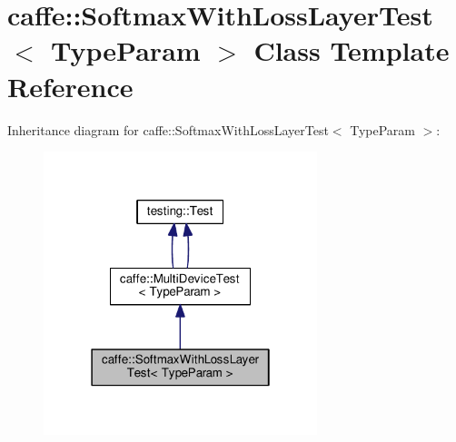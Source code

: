 \hypertarget{classcaffe_1_1_softmax_with_loss_layer_test}{}\section{caffe\+:\+:Softmax\+With\+Loss\+Layer\+Test$<$ Type\+Param $>$ Class Template Reference}
\label{classcaffe_1_1_softmax_with_loss_layer_test}


Inheritance diagram for caffe\+:\+:Softmax\+With\+Loss\+Layer\+Test$<$ Type\+Param $>$\+:
\nopagebreak
\begin{figure}[H]
\begin{center}
\leavevmode
\includegraphics[width=226pt]{classcaffe_1_1_softmax_with_loss_layer_test__inherit__graph}
\end{center}
\end{figure}
